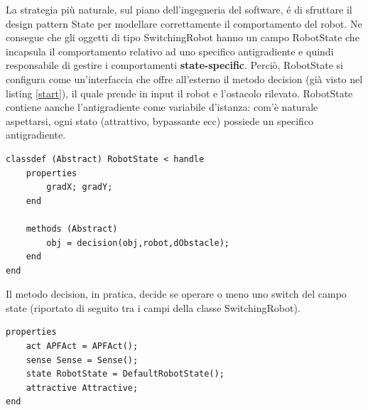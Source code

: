 \documentclass[14pt,a4paper]{extarticle}
\begin{document}
La strategia più naturale, sul piano dell'ingegneria del software, é di sfruttare il design pattern State per modellare correttamente il comportamento del robot. Ne consegue che gli oggetti di tipo SwitchingRobot hanno un campo RobotState che incapsula il comportamento relativo ad uno specifico antigradiente e quindi responsabile di gestire i comportamenti \textbf{state-specific}. Perciò, RobotState si configura come un'interfaccia che offre all'esterno il metodo decision (già visto nel listing \ref{start}), il quale prende in input il robot e l'ostacolo rilevato. RobotState contiene aanche l'antigradiente come variabile d'istanza: com'è naturale aspettarsi, ogni stato (attrattivo, bypassante ecc) possiede un specifico antigradiente. 
\begin{lstlisting}
classdef (Abstract) RobotState < handle
    properties
        gradX; gradY;
    end
    
    methods (Abstract)
        obj = decision(obj,robot,dObstacle);
    end
end
\end{lstlisting}
Il metodo decision, in pratica, decide se operare o meno uno switch del campo state (riportato di seguito tra i campi della classe SwitchingRobot).
\begin{lstlisting}
properties
	act APFAct = APFAct();
	sense Sense = Sense();
	state RobotState = DefaultRobotState();
	attractive Attractive;
end
\end{lstlisting}
\end{document}
